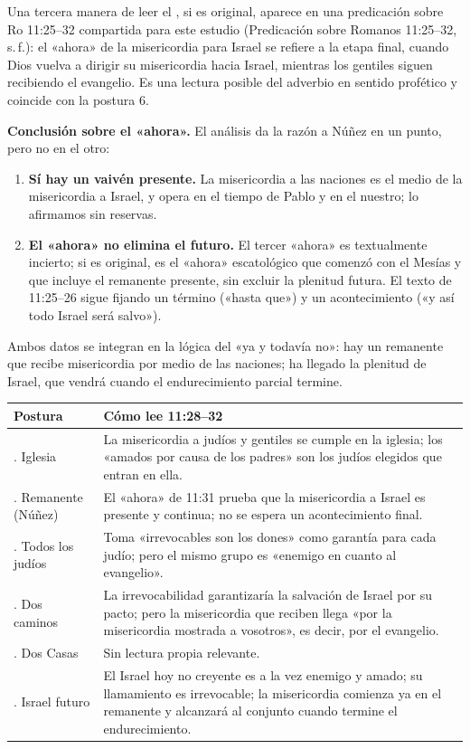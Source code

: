 Una tercera manera de leer el , si es original, aparece en una predicación sobre Ro 11:25--32 compartida para este estudio (Predicación sobre Romanos 11:25--32, s.\,f.): el «ahora» de la misericordia para Israel se refiere a la etapa final, cuando Dios vuelva a dirigir su misericordia hacia Israel, mientras los gentiles siguen recibiendo el evangelio. Es una lectura posible del adverbio en sentido profético y coincide con la postura 6.

\textbf{Conclusión sobre el «ahora».} El análisis da la razón a Núñez en un punto, pero no en el otro:
\begin{enumerate}
\item \textbf{Sí hay un vaivén presente.} La misericordia a las naciones es el medio de la misericordia a Israel, y opera en el tiempo de Pablo y en el nuestro; lo afirmamos sin reservas.
\item \textbf{El «ahora» no elimina el futuro.} El tercer «ahora» es textualmente incierto; si es original, es el «ahora» escatológico que comenzó con el Mesías y que incluye el remanente presente, sin excluir la plenitud futura. El texto de 11:25--26 sigue fijando un término («hasta que») y un acontecimiento («y así todo Israel será salvo»).
\end{enumerate}
Ambos datos se integran en la lógica del «ya y todavía no»:  hay un remanente que recibe misericordia por medio de las naciones;  ha llegado la plenitud de Israel, que vendrá cuando el endurecimiento parcial termine.

\begin{center}\footnotesize
\renewcommand{\arraystretch}{1.25}
\begin{tabular}{>{\RaggedRight\arraybackslash}p{2.9cm}>{\RaggedRight\arraybackslash}p{11.1cm}}
\toprule
\textbf{Postura} & \textbf{Cómo lee 11:28--32}\\
\midrule
1. Iglesia & La misericordia a judíos y gentiles se cumple en la iglesia; los «amados por causa de los padres» son los judíos elegidos que entran en ella.\\
2. Remanente (Núñez) & El «ahora» de 11:31 prueba que la misericordia a Israel es presente y continua; no se espera un acontecimiento final.\\
3. Todos los judíos & Toma «irrevocables son los dones» como garantía para cada judío; pero el mismo grupo es «enemigo en cuanto al evangelio».\\
4. Dos caminos & La irrevocabilidad garantizaría la salvación de Israel por su pacto; pero la misericordia que reciben llega «por la misericordia mostrada a vosotros», es decir, por el evangelio.\\
5. Dos Casas & Sin lectura propia relevante.\\
6. Israel futuro & El Israel hoy no creyente es a la vez enemigo y amado; su llamamiento es irrevocable; la misericordia comienza ya en el remanente y alcanzará al conjunto cuando termine el endurecimiento.\\
\bottomrule
\end{tabular}\end{center}

